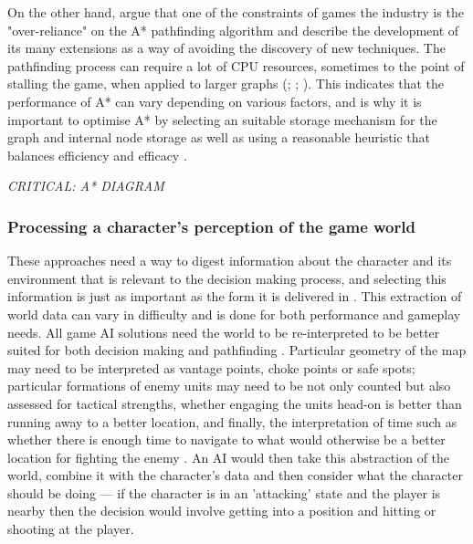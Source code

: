 \documentclass[11pt, a4paper]{article}
\begin{document}
On the other hand, \citeauthor{graham2003pathfinding} \parencite*[68]{graham2003pathfinding} argue that one of the constraints of games the industry is the "over-reliance" on the A* pathfinding algorithm and describe the development of its many extensions as a way of avoiding the discovery of new techniques. The pathfinding process can require a lot of CPU resources, sometimes to the point of stalling the game, when applied to larger graphs (\cite[127]{cui2011based}; \cite[110]{stentz1996map}; \cite[67]{graham2003pathfinding}). This indicates that the performance of A* can vary depending on various factors, and is why it is important to optimise A* by selecting an suitable storage mechanism for the graph and internal node storage as well as using a reasonable heuristic that balances efficiency and efficacy \parencite[228]{millington2019ai}.

\emph{CRITICAL: A* DIAGRAM}

\subsubsection{Processing a character's perception of the game world}

These approaches need a way to digest information about the character and its environment that is relevant to the decision making process, and selecting this information is just as important as the form it is delivered in \parencite[126]{cui2011based}. This extraction of world data can vary in difficulty \parencite[3]{diller2004behavior} and is done for both performance and gameplay needs. All game AI solutions need the world to be re-interpreted to be better suited for both decision making \parencite[2]{buro2004call} and pathfinding \parencite[3]{diller2004behavior}. Particular geometry of the map may need to be interpreted as vantage points, choke points or safe spots; particular formations of enemy units may need to be not only counted but also assessed for tactical strengths, whether engaging the units head-on is better than running away to a better location, and finally, the interpretation of time such as whether there is enough time to navigate to what would otherwise be a better location for fighting the enemy \parencite{buro2004call}. An AI would then take this abstraction of the world, combine it with the character's data and then consider what the character should be doing --- if the character is in an 'attacking' state and the player is nearby then the decision would involve getting into a position and hitting or shooting at the player. 
\end{document}
